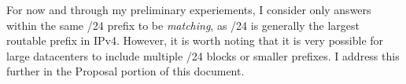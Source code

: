 For now and through my preliminary experiements, I consider only answers within the
same /24 prefix to be \emph{matching}, as /24 is generally the largest routable prefix in IPv4.
However, it is worth noting that it is very possible for large datacenters to include multiple /24
blocks or smaller prefixes. I address this further in the Proposal portion of this document.


